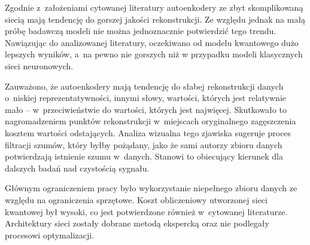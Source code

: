 Zgodnie z~założeniami cytowanej literatury autoenkodery ze zbyt skomplikowaną siecią mają tendencję do gorszej jakości rekonstrukcji. Ze względu jednak na małą próbę badawczą modeli nie można jednoznacznie potwierdzić tego trendu. Nawiązując do analizowanej literatury, oczekiwano od modelu kwantowego dużo lepszych wyników, a~na pewno nie gorszych niż w przypadku modeli klasycznych sieci neuronowych.

Zauważono, że autoenkodery mają tendencję do słabej rekonstrukcji danych o~niskiej reprezentatywności, innymi słowy, wartości, których jest relatywnie mało – w~przeciwieństwie do wartości, których jest najwięcej. Skutkowało to nagromadzeniem punktów rekonstrukcji w~miejscach oryginalnego zagęszczenia kosztem wartości odstających. Analiza wizualna tego zjawiska sugeruje proces filtracji szumów, który byłby pożądany, jako że sami autorzy zbioru danych potwierdzają istnienie szumu w~danych. Stanowi to obiecujący kierunek dla dalszych badań nad czystością sygnału.

Głównym ograniczeniem pracy było wykorzystanie niepełnego zbioru danych ze względu na ograniczenia sprzętowe. Koszt obliczeniowy utworzonej sieci kwantowej był wysoki, co jest potwierdzone również w~cytowanej literaturze. Architektury sieci zostały dobrane metodą ekspercką oraz nie podlegały procesowi optymalizacji.